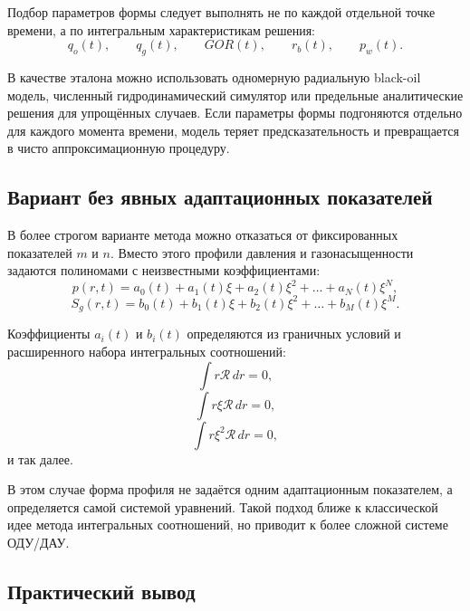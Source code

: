 \documentclass[12pt,a4paper]{article}
\begin{document}
Подбор параметров формы следует выполнять не по каждой отдельной точке времени, а по интегральным характеристикам решения:
\begin{equation}
    q_o(t), \qquad q_g(t), \qquad GOR(t), \qquad r_b(t), \qquad p_w(t).
\end{equation}

В качестве эталона можно использовать одномерную радиальную black-oil модель, численный гидродинамический симулятор или предельные аналитические решения для упрощённых случаев. Если параметры формы подгоняются отдельно для каждого момента времени, модель теряет предсказательность и превращается в чисто аппроксимационную процедуру.

\subsection{Вариант без явных адаптационных показателей}

В более строгом варианте метода можно отказаться от фиксированных показателей $m$ и $n$. Вместо этого профили давления и газонасыщенности задаются полиномами с неизвестными коэффициентами:
\begin{equation}
    p(r,t)=a_0(t)+a_1(t)\xi+a_2(t)\xi^2+\ldots+a_N(t)\xi^N,
\end{equation}
\begin{equation}
    S_g(r,t)=b_0(t)+b_1(t)\xi+b_2(t)\xi^2+\ldots+b_M(t)\xi^M.
\end{equation}

Коэффициенты $a_i(t)$ и $b_i(t)$ определяются из граничных условий и расширенного набора интегральных соотношений:
\begin{equation}
    \int r\mathcal{R}\,dr=0,
\end{equation}
\begin{equation}
    \int r\xi\mathcal{R}\,dr=0,
\end{equation}
\begin{equation}
    \int r\xi^2\mathcal{R}\,dr=0,
\end{equation}
и так далее.

В этом случае форма профиля не задаётся одним адаптационным показателем, а определяется самой системой уравнений. Такой подход ближе к классической идее метода интегральных соотношений, но приводит к более сложной системе ОДУ/ДАУ.

\subsection{Практический вывод}
\end{document}
